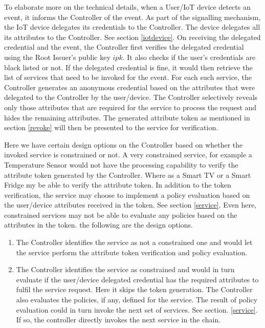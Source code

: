 \documentclass[journal]{IEEEtran}
\begin{document}
To elaborate more on the technical details, when a User/IoT device detects an event, it informs the Controller of the event. As part of the signalling mechanism, the IoT device delegates its credentials to the Controller. The device delegates all its attributes to the Controller. See section \ref{iotdevice}. On receiving the delegated credential and the event, the Controller first verifies the delegated credential using the Root Issuer's public key $ipk$. It also checks if the user's credentials are black listed or not. If the delegated credential is fine, it would then retrieve the list of services that need to be invoked for the event. For each such service, the Controller generates an anonymous credential based on the attributes that were delegated to the Controller by the user/device. The Controller selectively reveals only those attributes that are required for the service to process the request and hides the remaining attributes. The generated attribute token as mentioned in section \ref{revoke} will then be presented to the service for verification.

Here we have certain design options on the Controller based on whether the invoked service is constrained or not. A very constrained service, for example a Temperature Sensor would not have the processing capability to verify the attribute token generated by the Controller. Where as a Smart TV or a Smart Fridge my be able to verify the attribute token. In addition to the token verification, the service may choose to implement a policy evaluation based on the user/device attributes received in the token. See section \ref{service}. Even here, constrained services may not be able to evaluate any policies based on the attributes in the token. the following are the design options.

\begin{enumerate}[label=\alph*)]
	\item The Controller identifies the service as not a constrained one and would let the service perform the attribute token verification and policy evaluation.
	\item The Controller identifies the service as constrained and would in turn evaluate if the user/device delegated credential has the required attributes to fulfil the service request. Here it skips the token generation. The Controller also evaluates the policies, if any, defined for the service. The result of policy evaluation could in turn invoke the next set of services. See section. \ref{service}. If so, the controller directly invokes the next service in the chain.
\end{enumerate}
\end{document}
